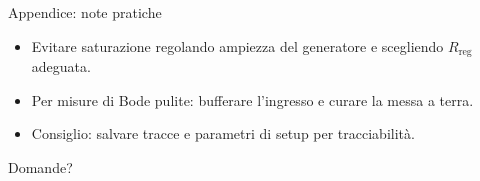 \documentclass[aspectratio=169]{beamer}
\begin{document}
\begin{frame}{Appendice: note pratiche}
\begin{itemize}
  \item Evitare saturazione regolando ampiezza del generatore e scegliendo $R_{\text{reg}}$ adeguata.
  \item Per misure di Bode pulite: bufferare l'ingresso e curare la messa a terra.
  \item Consiglio: salvare tracce e parametri di setup per tracciabilità.
\end{itemize}
\end{frame}

\begin{frame}
\centering
\Large Domande?
\end{frame}
\end{document}
